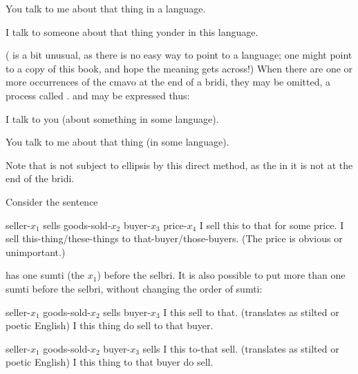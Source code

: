 \begin{example}
    \n
You talk to me about that thing in a language.
\end{example}

\begin{example}
    \n
I talk to someone about that thing yonder in this language.
\end{example}

( is a bit unusual, as there is no easy way to point to a language; one might point to a copy of this book, and hope the meaning gets across!) When there are one or more occurrences of the cmavo  at the end of a bridi, they may be omitted, a process called .  and  may be expressed thus:
\begin{example}
  \n
I talk to you (about something in some language).
\end{example}

\begin{example}
    \n
You talk to me about that thing (in some language).
\end{example}

Note that  is not subject to ellipsis by this direct method, as the  in it is not at the end of the bridi.



Consider the sentence
\begin{example}
     \n
seller-$x_1$ sells goods-sold-$x_2$ buyer-$x_3$ price-$x_4$\n
I sell this to that for some price.\n
I sell this-thing/these-things to that-buyer/those-buyers.\n
(The price is obvious or unimportant.)
\end{example}

 has one sumti (the $x_1$) before the selbri. It is also possible to put more than one sumti before the selbri, without changing the order of sumti:
\begin{example}
    \n
seller-$x_1$ goods-sold-$x_2$ sells buyer-$x_3$\n
I this sell to that.\n
(translates as stilted or poetic English)\n
I this thing do sell to that buyer.
\end{example}

\begin{example}
    \n
seller-$x_1$ goods-sold-$x_2$ buyer-$x_3$ sells\n
I this to-that sell.\n
(translates as stilted or poetic English)\n
I this thing to that buyer do sell.
\end{example}

